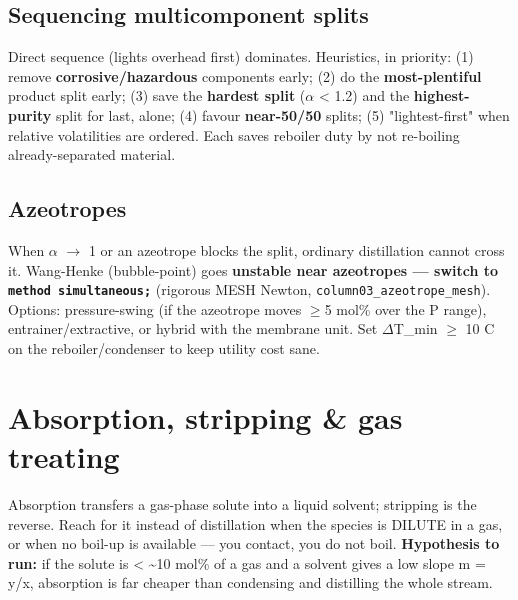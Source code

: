 \documentclass[11pt,a4paper]{article}
\begin{document}
\hypertarget{sequencing-multicomponent-splits}{%
\subsection{Sequencing multicomponent
splits}\label{sequencing-multicomponent-splits}}

Direct sequence (lights overhead first) dominates. Heuristics, in
priority: (1) remove \textbf{corrosive/hazardous} components early; (2)
do the \textbf{most-plentiful} product split early; (3) save the
\textbf{hardest split} (\(\alpha\) \textless{} 1.2) and the
\textbf{highest-purity} split for last, alone; (4) favour
\textbf{near-50/50} splits; (5) "lightest-first" when relative
volatilities are ordered. Each saves reboiler duty by not re-boiling
already-separated material.

\hypertarget{azeotropes}{%
\subsection{Azeotropes}\label{azeotropes}}

When \(\alpha\) \(\rightarrow\) 1 or an azeotrope blocks the split, ordinary distillation
cannot cross it. Wang-Henke (bubble-point) goes \textbf{unstable near
azeotropes --- switch to \texttt{method\ simultaneous;}} (rigorous MESH
Newton, \texttt{column03\_azeotrope\_mesh}). Options: pressure-swing (if
the azeotrope moves \(\ge\)5 mol\% over the P range), entrainer/extractive, or
hybrid with the membrane unit. Set \(\Delta\)T\_min \(\ge\) 10 \textdegree{}C on the
reboiler/condenser to keep utility cost sane.

\hypertarget{absorption-stripping--gas-treating}{%
\section{Absorption, stripping \& gas
treating}\label{absorption-stripping--gas-treating}}

Absorption transfers a gas-phase solute into a liquid solvent; stripping
is the reverse. Reach for it instead of distillation when the species is
DILUTE in a gas, or when no boil-up is available --- you contact, you do
not boil. \textbf{Hypothesis to run:} if the solute is \textless{}
\textasciitilde10 mol\% of a gas and a solvent gives a low slope m =
y/x, absorption is far cheaper than condensing and distilling the whole
stream.
\end{document}
